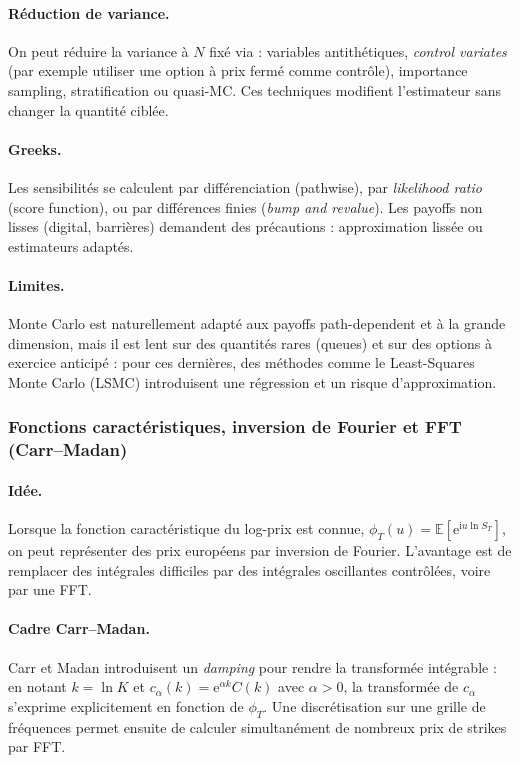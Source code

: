 \documentclass[11pt,a4paper]{article}
\newcommand{\ee}{\mathrm{e}}
\newcommand{\ii}{\mathrm{i}}
\newcommand{\E}{\mathbb{E}}
\newcommand{\1}{\mathbf{1}}
\begin{document}
\paragraph{R\'eduction de variance.}
On peut r\'eduire la variance \`a $N$ fix\'e via : variables antith\'etiques, \emph{control variates}
(par exemple utiliser une option \`a prix ferm\'e comme contr\^ole), importance sampling, stratification ou quasi-MC.
Ces techniques modifient l'estimateur sans changer la quantit\'e cibl\'ee.

\paragraph{Greeks.}
Les sensibilit\'es se calculent par diff\'erenciation (pathwise), par \emph{likelihood ratio} (score function), ou par
diff\'erences finies (\emph{bump and revalue}). Les payoffs non lisses (digital, barri\`eres) demandent des pr\'ecautions :
approximation liss\'ee ou estimateurs adapt\'es.

\paragraph{Limites.}
Monte Carlo est naturellement adapt\'e aux payoffs path-dependent et \`a la grande dimension, mais il est lent sur des
quantit\'es rares (queues) et sur des options \`a exercice anticip\'e : pour ces derni\`eres, des m\'ethodes comme le
Least-Squares Monte Carlo (LSMC) introduisent une r\'egression et un risque d'approximation.

\subsubsection{Fonctions caract\'eristiques, inversion de Fourier et FFT (Carr--Madan)}

\paragraph{Id\'ee.}
Lorsque la fonction caract\'eristique du log-prix est connue,
$\phi_T(u)=\E[\ee^{\ii u \ln S_T}]$, on peut repr\'esenter des prix europ\'eens par inversion de Fourier.
L'avantage est de remplacer des int\'egrales difficiles par des int\'egrales oscillantes contr\^ol\'ees, voire par une FFT.

\paragraph{Cadre Carr--Madan.}
Carr et Madan introduisent un \emph{damping} pour rendre la transform\'ee int\'egrable : en notant $k=\ln K$ et
$c_\alpha(k)=\ee^{\alpha k}C(k)$ avec $\alpha>0$, la transform\'ee de $c_\alpha$ s'exprime explicitement en fonction de $\phi_T$.
Une discr\'etisation sur une grille de fr\'equences permet ensuite de calculer simultan\'ement de nombreux prix de strikes par FFT.
\end{document}
